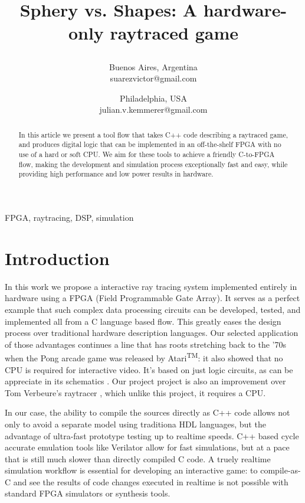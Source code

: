 \documentclass[conference]{IEEEtran}
\begin{document}
\title{Sphery vs. Shapes: A hardware-only raytraced game\\

\author{
Buenos Aires, Argentina \\
suarezvictor@gmail.com
\and
{}
Philadelphia, USA \\
julian.v.kemmerer@gmail.com
}}

\maketitle

\begin{abstract}
In this article we present a tool flow that takes C++ code describing a raytraced game, and produces digital logic that can be implemented in an off-the-shelf FPGA with no use of a hard or soft CPU. We aim for these tools to achieve a friendly C-to-FPGA flow, making the development and simulation process exceptionally fast and easy, while providing high performance and low power results in hardware.
\end{abstract}

\begin{IEEEkeywords}
FPGA, raytracing, DSP, simulation
\end{IEEEkeywords}

\section{Introduction}
In this work we propose a interactive ray tracing system implemented entirely in hardware using a FPGA (Field Programmable Gate Array). It  serves as a perfect example that such complex data processing circuits can be developed, tested, and implemented all from a C language based flow. This greatly eases the design process over traditional hardware description languages. Our selected application of those advantages continues a line that has roots stretching back to the '70s when the Pong arcade game was released by Atari\textsuperscript{TM}: it also showed that no CPU is required for interactive video. It's based on just logic circuits, as can be appreciate in its schematics \cite{pong}. Our project project is also an improvement over Tom Verbeure's raytracer \cite{tomrt}, which unlike this project, it requires a CPU.

In our case, the ability to compile the sources directly as C++ code allows not only to avoid a separate model using traditiona HDL languages, but the advantage of ultra-fast prototype testing up to realtime speeds. C++ based cycle accurate emulation tools like Verilator\cite{verilator} allow for fast simulations, but at a pace that is still much slower than directly compiled C code. A truely realtime simulation workflow is essential for developing an interactive game: to compile-as-C and see the results of code changes executed in realtime is not possible with standard FPGA simulators or synthesis tools.
\end{document}
